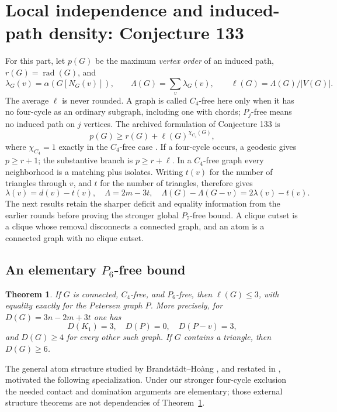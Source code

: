 \documentclass[11pt,a4paper]{article}
\newtheorem{theorem}{Theorem}[section]
\theoremstyle{definition}\newtheorem{definition}[theorem]{Definition}
\theoremstyle{remark}\newtheorem{remark}[theorem]{Remark}
\newcommand{\rad}{\operatorname{rad}}
\begin{document}
\section{Local independence and induced-path density: Conjecture 133}
\label{sec:local-density}
For this part, let $p(G)$ be the maximum \emph{vertex order} of an induced
path, $r(G)=\rad(G)$, and
\[
 \lambda_G(v)=\alpha(G[N_G(v)]),\qquad
 \Lambda(G)=\sum_v\lambda_G(v),\qquad \ell(G)=\Lambda(G)/|V(G)|.
\]
The average $\ell$ is never rounded. A graph is called $C_4$-free here
only when it has no four-cycle as an ordinary subgraph, including one
with chords; $P_j$-free means no induced path on $j$ vertices.
The archived formulation of Conjecture 133 is
\begin{equation}\label{local:target}
 p(G)\ge r(G)+\ell(G)^{\chi_{C_4}(G)},
\end{equation}
where $\chi_{C_4}=1$ exactly in the $C_4$-free case
\cite{src:catalogue,src:definitions}. If a four-cycle occurs, a geodesic
gives $p\ge r+1$; the substantive branch is $p\ge r+\ell$.
In a $C_4$-free graph every neighborhood is a matching plus isolates.
Writing $t(v)$ for the number of triangles through $v$, and $t$ for
the number of triangles, therefore gives
\begin{equation}\label{local:potential}
 \lambda(v)=d(v)-t(v),\quad \Lambda=2m-3t,\quad
 \Lambda(G)-\Lambda(G-v)=2\lambda(v)-t(v).
\end{equation}
The next results retain the sharper deficit and equality information
from the earlier rounds before proving the stronger global $P_7$-free
bound. A clique cutset is a clique whose removal disconnects a connected
graph, and an atom is a connected graph with no clique cutset.


\subsection{\texorpdfstring{An elementary $P_6$-free bound}{An elementary P6-free bound}}
\begin{theorem}\label{local9:thm:p6}
If $G$ is connected, $C_4$-free, and $P_6$-free, then $\ell(G)\le3$, with equality
exactly for the Petersen graph $P$. More precisely, for
$D(G)=3n-2m+3t$ one has
\[
 D(K_1)=3,\quad D(P)=0,\quad D(P-v)=3,
\]
and $D(G)\ge4$ for every other such graph. If $G$ contains a triangle,
then $D(G)\ge6$.
\end{theorem}

The general atom structure studied by Brandst\"adt--Ho\`ang
\cite{src:bh}, and restated in \cite[Theorem 9]{src:ghp}, motivated the following
specialization. Under our stronger four-cycle exclusion the needed
contact and domination arguments are elementary; those external structure
theorems are not dependencies of Theorem~\ref{local9:thm:p6}.
\end{document}
